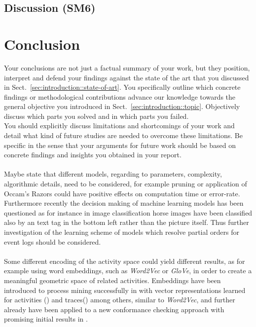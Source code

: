 \documentclass[
	a4paper,
	pagesize,
	pdftex,
	12pt,
	ngerman,
	fleqn,
	final,
	]{scrartcl}
\theoremstyle{plain}
\theoremstyle{definition}
\begin{document}
	\subsection{Discussion (SM6)}

\section{Conclusion}
		Your conclusions are not just a factual summary of your work, but they position, interpret and defend your findings against the state of the art that you discussed in Sect.~\ref{sec:introduction::state-of-art}. You specifically outline which concrete findings or methodological contributions advance our knowledge towards the general objective you introduced in Sect.~\ref{sec:introduction::topic}. Objectively discuss which parts you solved and in which parts you failed. \\
		You should explicitly discuss limitations and shortcomings of your work and detail what kind of future studies are needed to overcome these limitations. Be specific in the sense that your arguments for future work should be based on concrete findings and insights you obtained in your report.\\
		\\
		Maybe state that different models, regarding to parameters, complexity, algorithmic details, need to be considered, for example pruning or application of Occam's Razors could have positive effects on computation time or error-rate. \cite{domingos1998occam} Furthermore recently the decision making of machine learning models has been questioned as for instance in image classification horse images have been classified also by an text tag in the bottom left rather than the picture itself. \cite{lapuschkin2019unmasking} Thus further investigation of the learning scheme of models which resolve partial orders for event logs should be considered.\\
		\\
		Some different encoding of the activity space could yield different results, as for example using word embeddings, such as \textit{Word2Vec} or \textit{GloVe}, in order to create a meaningful geometric space of related activities. Embeddings have been introduced to process mining successfully in \cite{de2018act2vec} with vector representations learned for activities () and traces() among others, similar to \textit{Word2Vec}, and further already have been applied to a new conformance checking approach with promising initial results in \cite{peeperkorn2020conformance}. \\
\end{document}

